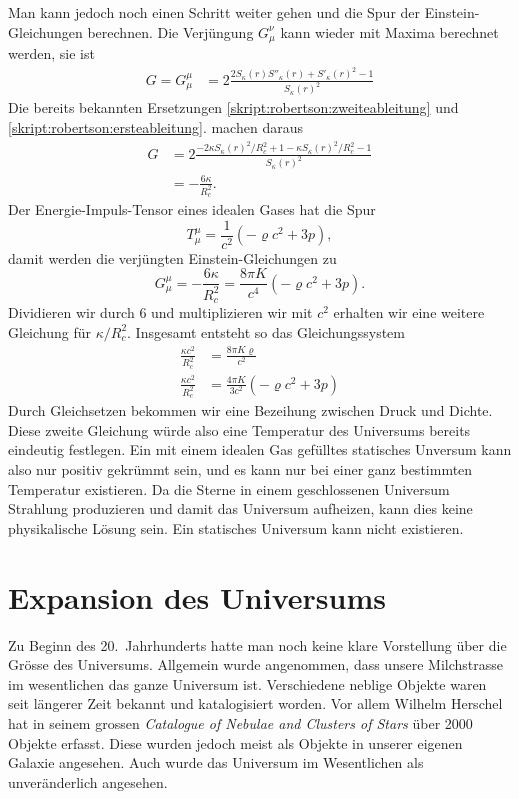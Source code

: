 Man kann jedoch noch einen Schritt weiter gehen und die Spur der
Einstein-Gleichungen berechnen.
Die Verjüngung $G_\mu^\nu$ kann wieder mit Maxima berechnet werden,
sie ist
\begin{align*}
G=G_\mu^\mu
&=
2\frac{2S_\kappa(r)S''_\kappa(r) + S'_\kappa(r)^2-1}{S_\kappa(r)^2}
\end{align*}
Die bereits bekannten Ersetzungen
\eqref{skript:robertson:zweiteableitung}
und
\eqref{skript:robertson:ersteableitung}.
machen daraus
\begin{align*}
G
&=
2\frac{-2\kappa S_\kappa(r)^2/R_c^2 + 1-\kappa S_\kappa(r)^2/R_c^2-1}{S_\kappa(r)^2}
\\
&=
-\frac{6\kappa}{R_c^2}.
\end{align*}
Der Energie-Impuls-Tensor eines idealen Gases hat die Spur
\[
T_\mu^\mu
=
\frac1{c^2}(-\varrho c^2+3p),
\]
damit werden die verjüngten Einstein-Gleichungen zu
\[
G_\mu^\mu
=
-\frac{6\kappa}{R_c^2}
=
\frac{8\pi K}{c^4}(-\varrho c^2 + 3p).
\]
Dividieren wir durch 6 und multiplizieren wir mit $c^2$ erhalten
wir eine weitere Gleichung für $\kappa/R_c^2$.
Insgesamt entsteht so das Gleichungssystem
\begin{align*}
\frac{\kappa c^2}{R_c^2}
&=
\frac{8\pi K\varrho}{c^2}
\\
\frac{\kappa c^2}{R_c^2}
&=
\frac{4\pi K}{3c^2}(-\varrho c^2 + 3p)
\end{align*}
Durch Gleichsetzen bekommen wir eine Bezeihung zwischen Druck und
Dichte.
Diese zweite Gleichung würde also eine Temperatur des Universums 
bereits eindeutig festlegen.
Ein mit einem idealen Gas gefülltes statisches Unversum kann also
nur positiv gekrümmt sein, und es kann
nur bei einer ganz bestimmten Temperatur existieren.
Da die Sterne in einem geschlossenen Universum Strahlung produzieren
und damit das Universum aufheizen, kann dies keine physikalische
Lösung sein.
Ein statisches Universum kann nicht existieren.

\section{Expansion des Universums}
Zu Beginn des 20.~Jahrhunderts hatte man noch keine klare Vorstellung
über die Grösse des Universums.
Allgemein wurde angenommen, dass unsere Milchstrasse im wesentlichen das
ganze Universum ist.
Verschiedene neblige Objekte waren seit längerer Zeit bekannt und
katalogisiert worden.
Vor allem Wilhelm Herschel hat in seinem grossen 
%
{\em Catalogue of Nebulae and Clusters of Stars} über 2000 Objekte
%
erfasst.
Diese wurden jedoch meist als Objekte in unserer eigenen Galaxie angesehen.
Auch wurde das Universum im Wesentlichen als unveränderlich angesehen.

